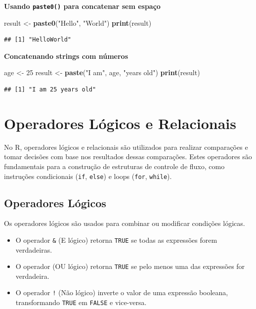 \documentclass[
]{book}
\newenvironment{Shaded}{\begin{snugshade}}{\end{snugshade}}
\newcommand{\DecValTok}[1]{\textcolor[rgb]{0.00,0.00,0.81}{#1}}
\newcommand{\FunctionTok}[1]{\textcolor[rgb]{0.13,0.29,0.53}{\textbf{#1}}}
\newcommand{\NormalTok}[1]{#1}
\newcommand{\OtherTok}[1]{\textcolor[rgb]{0.56,0.35,0.01}{#1}}
\newcommand{\StringTok}[1]{\textcolor[rgb]{0.31,0.60,0.02}{#1}}
\begin{document}
\textbf{Usando \texttt{paste0()} para concatenar sem espaço}

\begin{Shaded}
\begin{Highlighting}[]
\NormalTok{result }\OtherTok{\textless{}{-}} \FunctionTok{paste0}\NormalTok{(}\StringTok{"Hello"}\NormalTok{, }\StringTok{"World"}\NormalTok{)}
\FunctionTok{print}\NormalTok{(result)}
\end{Highlighting}
\end{Shaded}

\begin{verbatim}
## [1] "HelloWorld"
\end{verbatim}

\textbf{Concatenando strings com números}

\begin{Shaded}
\begin{Highlighting}[]
\NormalTok{age }\OtherTok{\textless{}{-}} \DecValTok{25}
\NormalTok{result }\OtherTok{\textless{}{-}} \FunctionTok{paste}\NormalTok{(}\StringTok{"I am"}\NormalTok{, age, }\StringTok{"years old"}\NormalTok{)}
\FunctionTok{print}\NormalTok{(result)}
\end{Highlighting}
\end{Shaded}

\begin{verbatim}
## [1] "I am 25 years old"
\end{verbatim}

\section{Operadores Lógicos e Relacionais}\label{operadores-luxf3gicos-e-relacionais}

No R, operadores lógicos e relacionais são utilizados para realizar comparações e tomar decisões com base nos resultados dessas comparações. Estes operadores são fundamentais para a construção de estruturas de controle de fluxo, como instruções condicionais (\texttt{if}, \texttt{else}) e loops (\texttt{for}, \texttt{while}).

\subsection{Operadores Lógicos}\label{operadores-luxf3gicos}

Os operadores lógicos são usados para combinar ou modificar condições lógicas.

\begin{itemize}
\item
  O operador \texttt{\&} (E lógico) retorna \texttt{TRUE} se todas as expressões forem verdadeiras.
\item
  O operador \texttt{\textbar{}} (OU lógico) retorna \texttt{TRUE} se pelo menos uma das expressões for verdadeira.
\item
  O operador \texttt{!} (Não lógico) inverte o valor de uma expressão booleana, transformando \texttt{TRUE} em \texttt{FALSE} e vice-versa.
\end{itemize}
\end{document}
